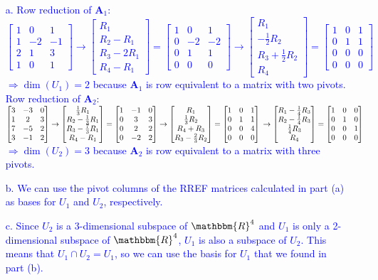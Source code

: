 \documentclass[a4paper,12pt]{article}
\newcommand{\R}{\mathbbm{R}}
\newcommand{\M}[1]{ \begin{bmatrix} #1 \end{bmatrix} }
\newcommand{\vsp}[1]{\vspace{#1mm}\\}
\newcommand{\matA}{\textbf{A}}
\begin{document}
\textcolor{blue}{
\begin{itemize}
 \item [a.] Row reduction of $\matA_1$: \vsp{2}
$\M{1&0&1\\1&-2&-1\\2&1&3\\1&0&1}
\rightarrow
\M{R_1\\R_2-R_1\\R_3-2R_1\\R_4-R_1}
=
\M{1&0&1\\0&-2&-2\\0&1&1\\0&0&0}
\rightarrow
\M{R_1\\-\frac{1}{2}R_2\\R_3+\frac{1}{2}R_2\\R_4}
=
\M{1&0&1\\0&1&1\\0&0&0\\0&0&0}
$
\vsp{2}                $\Rightarrow \dim(U_1) = 2$ because $\matA_1$ is row equivalent to a matrix with two pivots.
\vsp{3}
Row reduction of $\matA_2$: \vsp{2}
$\M{3&-3&0\\1&2&3\\7&-5&2\\3&-1&2}
\rightarrow
\M{\frac{1}{3}R_1\\R_2-\frac{1}{3}R_1\\R_3-\frac{7}{3}R_1\\R_4-R_1}
=
\M{1&-1&0\\0&3&3\\0&2&2\\0&-2&2}
\rightarrow
\M{R_1\\\frac{1}{3}R_2\\R_4+R_3\\R_3-\frac{2}{3}R_2}
=
\M{1&0&1\\0&1&1\\0&0&4\\0&0&0}
\vsp{3}
\rightarrow
\M{R_1-\frac{1}{4}R_3\\R_2-\frac{1}{4}R_3\\\frac{1}{4}R_3\\R_4}
=
\M{1&0&0\\0&1&0\\0&0&1\\0&0&0}
$
\vsp{2}                $\Rightarrow \dim(U_2) = 3$ because $\matA_2$ is row equivalent to a matrix with three pivots.
 \item [b.] We can use the pivot columns of the RREF matrices calculated in part (a) as bases for $U_1$ and $U_2$, respectively.
 \item [c.] Since $U_2$ is a 3-dimensional subspace of $\R^4$ and $U_1$ is only a 2-dimensional subspace of $\R^4$, $U_1$ is also a subspace of $U_2$.
 This means that $U_1 \cap U_2 = U_1$, so we can use the basis for $U_1$ that we found in part (b).
\end{itemize}
}
\end{document}
